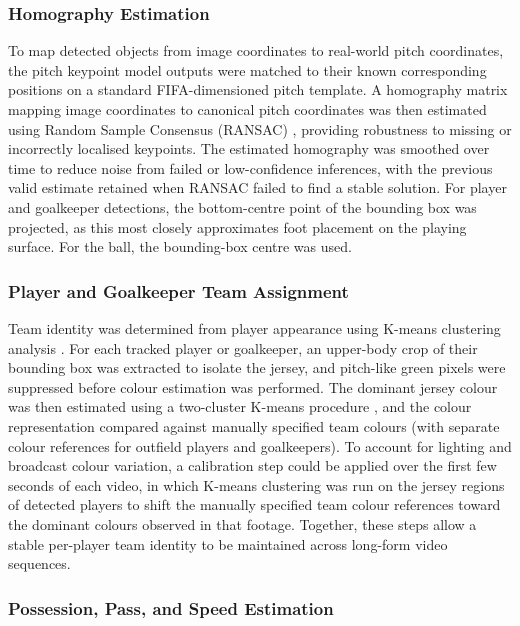 \subsubsection{Homography Estimation}

To map detected objects from image coordinates to real-world pitch coordinates, the pitch keypoint model outputs were matched to their known corresponding positions on a standard FIFA-dimensioned pitch template. A homography matrix mapping image coordinates to canonical pitch coordinates was then estimated using Random Sample Consensus (RANSAC) \cite{ransac}, providing robustness to missing or incorrectly localised keypoints. The estimated homography was smoothed over time to reduce noise from failed or low-confidence inferences, with the previous valid estimate retained when RANSAC failed to find a stable solution. For player and goalkeeper detections, the bottom-centre point of the bounding box was projected, as this most closely approximates foot placement on the playing surface. For the ball, the bounding-box centre was used.

\subsubsection{Player and Goalkeeper Team Assignment}

Team identity was determined from player appearance using K-means clustering analysis \cite{ZhengLiu2012ColorRecognition}. For each tracked player or goalkeeper, an upper-body crop of their bounding box was extracted to isolate the jersey, and pitch-like green pixels were suppressed before colour estimation was performed. The dominant jersey colour was then estimated using a two-cluster K-means procedure \cite{ZhengLiu2012ColorRecognition}, and the colour representation compared against manually specified team colours (with separate colour references for outfield players and goalkeepers). To account for lighting and broadcast colour variation, a calibration step could be applied over the first few seconds of each video, in which K-means clustering was run on the jersey regions of detected players to shift the manually specified team colour references toward the dominant colours observed in that footage. Together, these steps allow a stable per-player team identity to be maintained across long-form video sequences.

\subsubsection{Possession, Pass, and Speed Estimation}

